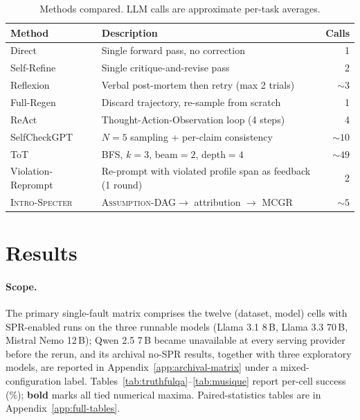 \documentclass{article}
\newcommand{\method}{\textsc{Intro-Specter}\xspace}
\newcommand{\dagg}{\textsc{Assumption-DAG}\xspace}
\newcommand{\mcgr}{\textsc{MCGR}\xspace}
\begin{document}
\begin{table}[h!]\centering\small
\caption{Methods compared. LLM calls are approximate per-task averages.}
\label{tab:methods}
\begin{tabular}{llr}\toprule
\textbf{Method} & \textbf{Description} & \textbf{Calls} \\\midrule
Direct & Single forward pass, no correction & 1 \\
Self-Refine~\citep{madaan2023selfrefine} & Single critique-and-revise pass & 2 \\
Reflexion~\citep{shinn2023reflexion} & Verbal post-mortem then retry (max 2 trials) & ${\sim}3$ \\
Full-Regen & Discard trajectory, re-sample from scratch & 1 \\
ReAct~\citep{yao2022react} & Thought-Action-Observation loop (4 steps) & 4 \\
SelfCheckGPT~\citep{manakul2023selfcheckgpt} & $N{=}5$ sampling + per-claim consistency & ${\sim}10$ \\
ToT~\citep{yao2023tot} & BFS, $k{=}3$, beam${=}2$, depth${=}4$ & ${\sim}49$ \\
Violation-Reprompt & Re-prompt with violated profile span as feedback (1 round) & 2 \\
\method & \dagg $\to$ attribution $\to$ \mcgr & ${\sim}5$ \\
\bottomrule\end{tabular}\end{table}

\section{Results}\label{sec:results}

\paragraph{Scope.} The primary single-fault matrix comprises the twelve (dataset, model) cells with SPR-enabled runs on the three runnable models (Llama 3.1 8\,B, Llama 3.3 70\,B, Mistral Nemo 12\,B); Qwen 2.5 7\,B became unavailable at every serving provider before the rerun, and its archival no-SPR results, together with three exploratory models, are reported in Appendix~\ref{app:archival-matrix} under a mixed-configuration label. Tables~\ref{tab:truthfulqa}--\ref{tab:musique} report per-cell success (\%); \textbf{bold} marks all tied numerical maxima. Paired-statistics tables are in Appendix~\ref{app:full-tables}.
\end{document}
